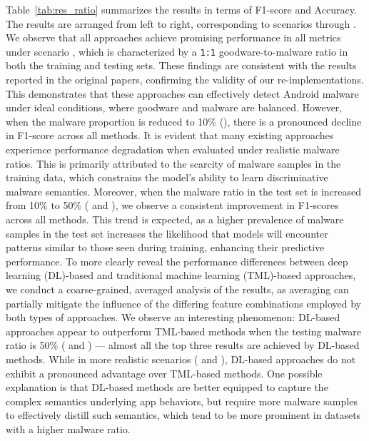 Table~\ref{tab:res_ratio} summarizes the results in terms of F1-score and Accuracy.
The results are arranged from left to right, corresponding to scenarios  through .
We observe that all approaches achieve promising performance in all metrics under scenario , which is characterized by a \texttt{1:1} goodware-to-malware ratio in both the training and testing sets.
These findings are consistent with the results reported in the original papers, confirming the validity of our re-implementations. 
This demonstrates that these approaches can effectively detect Android malware under ideal conditions, where goodware and malware are balanced.
However, when the malware proportion is reduced to 10\% (), there is a pronounced decline in F1-score across all methods.
It is evident that many existing approaches experience performance degradation when evaluated under realistic malware ratios.
This is primarily attributed to the scarcity of malware samples in the training data, which constrains the model's ability to learn discriminative malware semantics.
Moreover, when the malware ratio in the test set is increased from 10\% to 50\% ( and ), we observe a consistent improvement in F1-scores across all methods.
This trend is expected, as a higher prevalence of malware samples in the test set increases the likelihood that models will encounter patterns similar to those seen during training, enhancing their predictive performance.
To more clearly reveal the performance differences between deep learning (DL)-based and traditional machine learning (TML)-based approaches, we conduct a coarse-grained, averaged analysis of the results, as averaging can partially mitigate the influence of the differing feature combinations employed by both types of approaches.
We observe an interesting phenomenon: DL-based approaches appear to outperform TML-based methods when the testing malware ratio is 50\% ( and ) --- almost all the top three results are achieved by DL-based methods.
While in more realistic scenarios ( and ), DL-based approaches do not exhibit a pronounced advantage over TML-based methods.
One possible explanation is that DL-based methods are better equipped to capture the complex semantics underlying app behaviors, but require more malware samples to effectively distill such semantics, which tend to be more prominent in datasets with a higher malware ratio.

